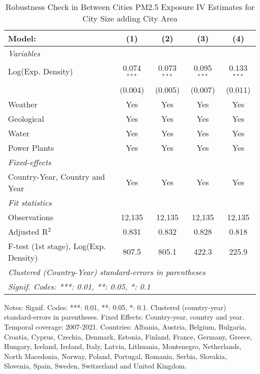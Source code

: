 
\begin{table}[htbp]
   \caption{\label{tab:iv_size_rob2} Robustness Check in Between Cities PM2.5 Exposure IV Estimates for City Size adding City Area}
   \centering
   \small
   \begin{tabular}{lcccc}
      \tabularnewline \midrule \midrule
      Model:                                & (1)           & (2)           & (3)           & (4)\\  
      \midrule
      \emph{Variables}\\
      Log(Exp. Density)                     & 0.074$^{***}$ & 0.073$^{***}$ & 0.095$^{***}$ & 0.133$^{***}$\\   
                                            & (0.004)       & (0.005)       & (0.007)       & (0.011)\\   
      Weather                               & Yes           & Yes           & Yes           & Yes\\  
      Geological                            & Yes           & Yes           & Yes           & Yes\\  
      Water                                 & Yes           & Yes           & Yes           & Yes\\  
      Power Plants                          & Yes           & Yes           & Yes           & Yes\\  
      \midrule
      \emph{Fixed-effects}\\
      Country-Year, Country and Year        & Yes           & Yes           & Yes           & Yes\\  
      \midrule
      \emph{Fit statistics}\\
      Observations                          & 12,135        & 12,135        & 12,135        & 12,135\\  
      Adjusted R$^2$                        & 0.831         & 0.832         & 0.828         & 0.818\\  
      F-test (1st stage), Log(Exp. Density) & 807.5         & 805.1         & 422.3         & 225.9\\  
      \midrule \midrule
      \multicolumn{5}{l}{\emph{Clustered (Country-Year) standard-errors in parentheses}}\\
      \multicolumn{5}{l}{\emph{Signif. Codes: ***: 0.01, **: 0.05, *: 0.1}}\\
   \end{tabular}
   
   \par \raggedright 
   Notes: Signif. Codes: ***: 0.01, **: 0.05, *: 0.1. Clustered (country-year) standard-errors in parentheses. Fixed Effects: Country-year, country and year. Temporal coverage: 2007-2021. Countries: Albania, Austria, Belgium, Bulgaria, Croatia, Cyprus, Czechia, Denmark, Estonia, Finland, France, Germany, Greece, Hungary, Iceland, Ireland, Italy, Latvia, Lithuania, Montenegro, Netherlands, North Macedonia, Norway, Poland, Portugal, Romania, Serbia, Slovakia, Slovenia, Spain, Sweden, Switzerland and United Kingdom.
\end{table}


